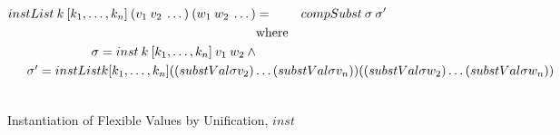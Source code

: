 \begin{figure}[H]
\begin{equation*}
\begin{aligned}
      instList \: k \: [k_1,\dots,k_n] \: (v_1 \: v_2 \: \dots) \: (w_1 \: w_2 \: \dots) & =              & compSubst \: \sigma \: \sigma'                                                                                                                                    \\
                                                                                         & \textrm{where} &                                                                                                                                                                   \\
      \sigma = inst \: k \: [k_1,\dots,k_n] \: v_1 \: w_2 \: \land                       &                &                                                                                                                                                                   \\
      \noalign{$\sigma'                                                                             =               instList \: k [k_1,\dots,k_n] \: ((substVal \sigma \: v_2) \dots (substVal \sigma \: v_n)) \: ((substVal \sigma \: w_2) \dots (substVal \sigma \: w_n))$} \\
    \end{aligned}
  \end{equation*}
  \caption{Instantiation of Flexible Values by Unification, $inst$}
\end{figure}
